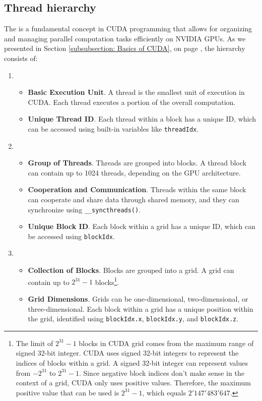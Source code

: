 \subsection{Thread hierarchy}

The  is a fundamental concept in CUDA programming that allows for organizing and managing parallel computation tasks efficiently on NVIDIA GPUs. As we presented in Section \ref{subsubsection: Basics of CUDA}, on page \pageref{subsubsection: Basics of CUDA}, the hierarchy consists of:
\begin{enumerate}
    \item {}
    \begin{itemize}
    	\item \textbf{Basic Execution Unit}. A thread is the smallest unit of execution in CUDA. Each thread executes a portion of the overall computation.
    	\item \textbf{Unique Thread ID}. Each thread within a block has a unique ID, which can be accessed using built-in variables like \texttt{threadIdx}.
    \end{itemize}
 
	\item {}
	\begin{itemize}
		\item \textbf{Group of Threads}. Threads are grouped into blocks. A thread block can contain up to 1024 threads, depending on the GPU architecture.
		\item \textbf{Cooperation and Communication}. Threads within the same block can cooperate and share data through shared memory, and they can synchronize using \texttt{\_\_syncthreads()}.
		\item \textbf{Unique Block ID}. Each block within a grid has a unique ID, which can be accessed using \texttt{blockIdx}.
	\end{itemize}
 
 	\item {}
 	\begin{itemize}
 		\item \textbf{Collection of Blocks}. Blocks are grouped into a grid. A grid can contain up to $2^{31} - 1$ blocks\footnote{The limit of $2^{31} - 1$ blocks in CUDA grid comes from the maximum range of signed 32-bit integer. CUDA uses signed 32-bit integers to represent the indices of blocks within a grid. A signed 32-bit integer can represent values from $-2^{31}$ to $2^{31} - 1$. Since negative block indices don't make sense in the context of a grid, CUDA only uses positive values. Therefore, the maximum positive value that can be used is $2^{31} - 1$, which equals $2'147'483'647$.}.
 		\item \textbf{Grid Dimensions}. Grids can be one-dimensional, two-dimensional, or three-dimensional. Each block within a grid has a unique position within the grid, identified using \texttt{blockIdx.x}, \texttt{blockIdx.y}, and \texttt{blockIdx.z}.
 	\end{itemize}
\end{enumerate}

